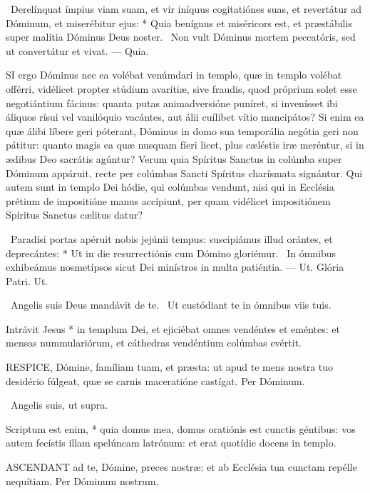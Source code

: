 \R\ Derelínquat ímpius viam suam, et vir iníquus cogitatiónes suas, et revertátur ad Dóminum, et miserébitur ejus: * Quia benígnus et miséricors est, et præstábilis super malítia Dóminus Deus noster. \V\ Non vult Dóminus mortem peccatóris, sed ut convertátur et vivat. --- Quia.


\lettrine[lines=2]{S}{I} ergo Dóminus nec ea volébat venúmdari in templo, quæ in templo volébat offérri, vidélicet propter stúdium avarítiæ, sive fraudis, quod próprium solet esse negotiántium fácinus: quanta putas animadversióne puníret, si invenísset ibi áliquos rísui vel vanilóquio vacántes, aut álii cuílibet vítio mancipátos? Si enim ea quæ álibi líbere geri póterant, Dóminus in domo sua temporália negótia geri non pátitur: quanto magis ea quæ nusquam fíeri licet, plus cæléstis iræ meréntur, si in ædibus Deo sacrátis agúntur? Verum quia Spíritus Sanctus in colúmba super Dóminum appáruit, recte per colúmbas Sancti Spíritus charísmata signántur. Qui autem sunt in templo Dei hódie, qui colúmbas vendunt, nisi qui in Ecclésia prétium de impositióne manus accípiunt, per quam vidélicet impositiónem Spíritus Sanctus cælitus datur?

\R\ Paradísi portas apéruit nobis jejúnii tempus: suscipiámus illud orántes, et deprecántes: * Ut in die resurrectiónis cum Dómino gloriémur. \V\ In ómnibus exhibeámus nosmetípsos sicut Dei minístros in multa patiéntia. --- Ut. Glória Patri. Ut.

\V\ Angelis suis Deus mandávit de te. \R\ Ut custódiant te in ómnibus viis tuis.

 Intrávit Jesus * in templum Dei, et ejiciébat omnes vendéntes et eméntes: et mensas nummulariórum, et cáthedras vendéntium colúmbas evértit.


\lettrine[lines=2]{R}{ESPICE}, Dómine, famíliam tuam, et præsta: ut apud te mens nostra tuo desidério fúlgeat, quæ se carnis maceratióne castígat. Per Dóminum.

\V\ Angelis suis, ut supra.

 Scriptum est enim, * quia domus mea, domus oratiónis est cunctis géntibus: vos autem fecístis illam spelúncam latrónum: et erat quotídie docens in templo.


\lettrine[lines=2]{A}{SCENDANT} ad te, Dómine, preces nostræ: et ab Ecclésia tua cunctam repélle nequítiam. Per Dóminum nostrum.

